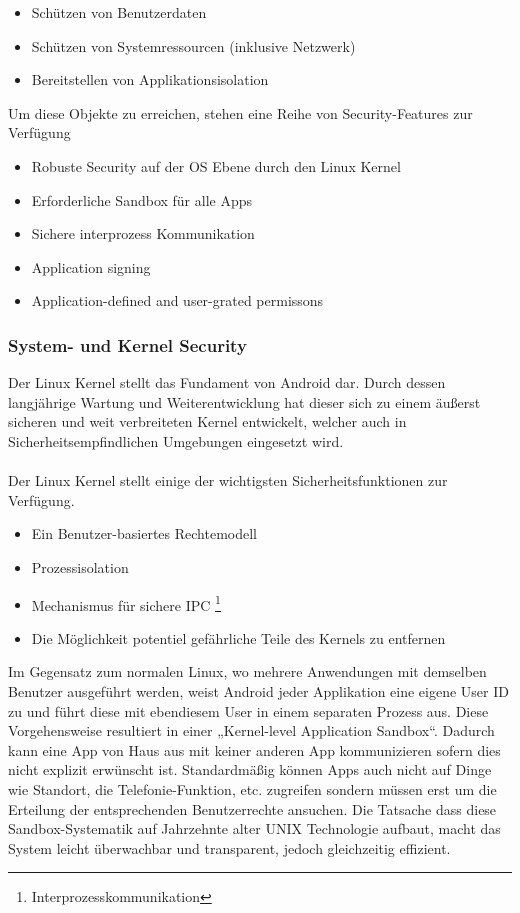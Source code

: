 \begin{itemize}
	\item Schützen von Benutzerdaten
	\item Schützen von Systemressourcen (inklusive Netzwerk)
	\item Bereitstellen von Applikationsisolation
\end{itemize}
Um diese Objekte zu erreichen, stehen eine Reihe von Security-Features zur Verfügung
\begin{itemize}
	\item Robuste Security auf der OS Ebene durch den Linux Kernel
	\item Erforderliche Sandbox für alle Apps
	\item Sichere interprozess Kommunikation
	\item Application signing
	\item Application-defined and user-grated permissons
\end{itemize}

\subsubsection{System- und Kernel Security}
Der Linux Kernel stellt das Fundament von Android dar. Durch dessen langjährige Wartung und Weiterentwicklung hat dieser sich zu einem äußerst sicheren und weit verbreiteten Kernel entwickelt, welcher auch in Sicherheitsempfindlichen Umgebungen eingesetzt wird.
\paragraph*{}
Der Linux Kernel stellt einige der wichtigsten Sicherheitsfunktionen zur Verfügung.
\begin{itemize}
	\item Ein Benutzer-basiertes Rechtemodell
	\item Prozessisolation
	\item Mechanismus für sichere IPC \footnote{Interprozesskommunikation} 
	\item Die Möglichkeit potentiel gefährliche Teile des Kernels zu entfernen
\end{itemize}
Im Gegensatz zum normalen Linux, wo mehrere Anwendungen mit demselben Benutzer ausgeführt werden, weist Android jeder Applikation eine eigene User ID zu und führt diese mit ebendiesem User in einem separaten Prozess aus.
Diese Vorgehensweise resultiert in einer „Kernel-level Application Sandbox“. Dadurch kann eine App von Haus aus mit keiner anderen App kommunizieren sofern dies nicht explizit erwünscht ist. Standardmäßig können Apps auch nicht auf Dinge wie Standort, die Telefonie-Funktion, etc. zugreifen sondern müssen erst um die Erteilung der entsprechenden Benutzerrechte ansuchen. Die Tatsache dass diese Sandbox-Systematik auf Jahrzehnte alter UNIX Technologie aufbaut, macht das System leicht überwachbar und transparent, jedoch gleichzeitig effizient.
